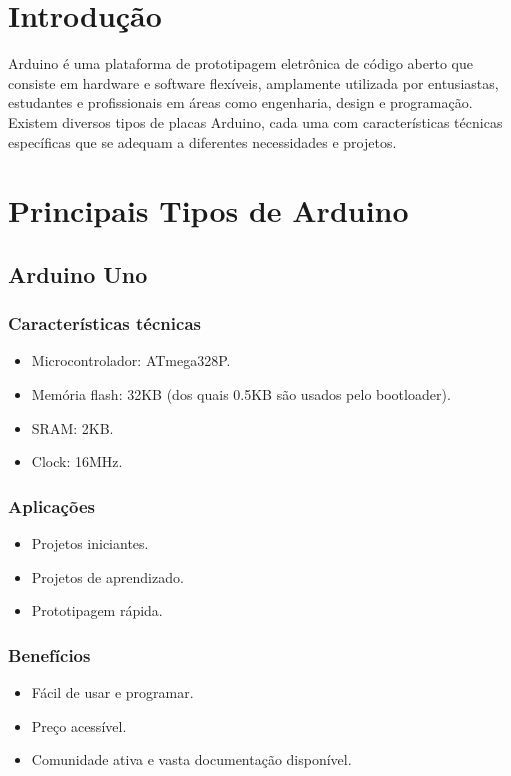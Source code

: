 \documentclass{estacio}
\begin{document}
\maketitle

\section{Introdução}
Arduino é uma plataforma de prototipagem eletrônica de código aberto que consiste em hardware e software flexíveis, amplamente utilizada por entusiastas, estudantes e profissionais em áreas como engenharia, design e programação. Existem diversos tipos de placas Arduino, cada uma com características técnicas específicas que se adequam a diferentes necessidades e projetos.

\section{Principais Tipos de Arduino}

\subsection{Arduino Uno}
\subsubsection{Características técnicas}
\begin{itemize}
    \item Microcontrolador: ATmega328P.
    \item Memória flash: 32KB (dos quais 0.5KB são usados pelo bootloader).
    \item SRAM: 2KB.
    \item Clock: 16MHz.
\end{itemize}
\subsubsection{Aplicações}
\begin{itemize}
    \item Projetos iniciantes.
    \item Projetos de aprendizado.
    \item Prototipagem rápida.
\end{itemize}
\subsubsection{Benefícios}
\begin{itemize}
    \item Fácil de usar e programar.
    \item Preço acessível.
    \item Comunidade ativa e vasta documentação disponível.
\end{itemize}
\end{document}
